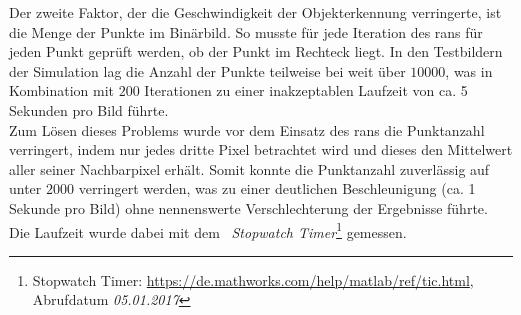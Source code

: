Der zweite Faktor, der die Geschwindigkeit der Objekterkennung verringerte, ist die Menge der Punkte im Binärbild. So musste für jede Iteration des \gls{rans} für jeden Punkt geprüft werden, ob der Punkt im Rechteck liegt. In den Testbildern der Simulation lag die Anzahl der Punkte teilweise bei weit über $10000$, was in Kombination mit $200$ Iterationen zu einer inakzeptablen Laufzeit von ca. 5 Sekunden pro Bild führte.\\
Zum Lösen dieses Problems wurde vor dem Einsatz des \gls{rans} die Punktanzahl verringert, indem nur jedes dritte Pixel betrachtet wird und dieses den Mittelwert aller seiner Nachbarpixel erhält. Somit konnte die Punktanzahl zuverlässig auf unter $2000$ verringert werden, was zu einer deutlichen Beschleunigung (ca. 1 Sekunde pro Bild) ohne nennenswerte Verschlechterung der Ergebnisse führte. Die Laufzeit wurde dabei mit dem \matlab\ \textit{Stopwatch Timer}\footnote{Stopwatch Timer: \url{https://de.mathworks.com/help/matlab/ref/tic.html}, Abrufdatum \textit{05.01.2017}} gemessen.
